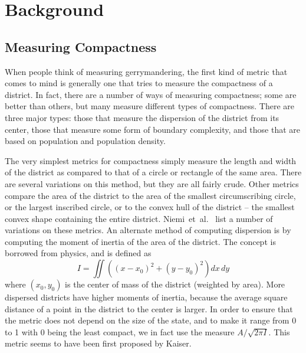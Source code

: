 \documentclass[12pt]{article}
\begin{document}
  \section{Background}\label{s:background}

  \subsection{Measuring Compactness}

  When people think of measuring gerrymandering, the first kind of metric that comes to mind is generally one that tries to measure the compactness of a district.  In fact, there are a number of ways of measuring compactness; some are better than others, but many measure different types of compactness.  There are three major types: those that measure the dispersion of the district from its center, those that measure some form of boundary complexity, and those that are based on population and population density.

  The very simplest metrics for compactness simply measure the length and width of the district as compared to that of a circle or rectangle of the same area.  There are several variations on this method, but they are all fairly crude.  Other metrics compare the area of the district to the area of the smallest circumscribing circle, or the largest inscribed circle, or to the convex hull of the district -- the smallest convex shape containing the entire district.  Niemi~et~al.~\cite{niemi} list a number of variations on these metrics.  An alternate method of computing dispersion is by computing the moment of inertia of the area of the district.  The concept is borrowed from physics, and is defined as
  \[I = \iint \left((x-x_0)^2 + (y-y_0)^2\right) dx\, dy \]
  where $(x_0, y_0)$ is the center of mass of the district (weighted by area).  More dispersed districts have higher moments of inertia, because the average square distance of a point in the district to the center is larger.  In order to ensure that the metric does not depend on the size of the state, and to make it range from 0 to 1 with 0 being the least compact, we in fact use the measure $A/\sqrt{2\pi I}$.  This metric seems to have been first proposed by Kaiser.~\cite{kaiser}
\end{document}
